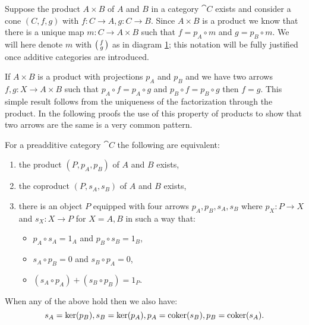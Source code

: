 \begin{notation}
  \label{not:matrix_product}
  Suppose the product \(A\times B\) of \(A\) and \(B\) in a category \(\cat{C}\) exists and consider a cone \((C, f, g)\) with \(f\colon C\to A, g\colon C\to B\). Since \(A\times B\) is a product we know that there is a unique map \(m\colon C\to A\times B\) such that \(f=p_A\circ m\) and \(g = p_B\circ m\). We will here denote \(m\) with \(\left(\begin{smallmatrix}f\\ g\end{smallmatrix}\right)\) as in diagram \ref{diagram:product}; this notation will be fully justified once additive categories are introduced.

  \begin{figure}
    
    \caption{}
    \label{diagram:product}
  \end{figure}
\end{notation}

\begin{remark}
  \label{remark:product_property}
  If \(A\times B\) is a product with projections \(p_A\) and \(p_B\) and we have two arrows \(f,g\colon X\to A\times B\) such that \(p_A\circ f = p_A\circ g\) and \(p_B\circ f = p_B\circ g\) then \(f = g\). This simple result follows from the uniqueness of the factorization through the product. In the following proofs the use of this property of products to show that two arrows are the same is a very common pattern.
\end{remark}

\begin{proposition}
  \label{prop:existence_of_products}
  For a preadditive category \(\cat{C}\) the following are equivalent:
  \begin{enumerate}[label=(\arabic*)]
  \item the product \((P, p_A, p_B)\) of \(A\) and \(B\) exists,
  \item the coproduct \((P, s_A, s_B)\) of \(A\) and \(B\) exists,
  \item there is an object \(P\) equipped with four arrows \(p_A,p_B,s_A,s_B\) where \(p_X\colon P\to X\) and \(s_X\colon X\to P\) for \(X=A,B\) in such a way that:
    \begin{itemize}
    \item \(p_A\circ s_A = 1_A\) and \(p_B\circ s_B = 1_B\),
    \item \(s_A\circ p_B = 0\) and \(s_B\circ p_A = 0\),
    \item \((s_A\circ p_A) + (s_B\circ p_B) = 1_P\).
    \end{itemize}
  \end{enumerate}
  When any of the above hold then we also have:
  \[s_A=\ker(p_B), s_B=\ker(p_A), p_A=\operatorname{coker}(s_B), p_B=\operatorname{coker}(s_A).\]
\end{proposition}

